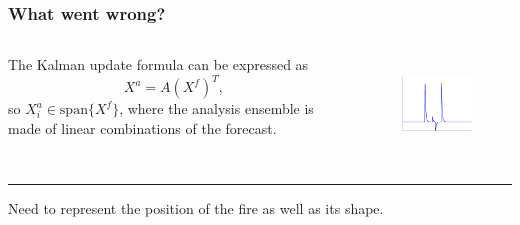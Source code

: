 \documentclass{beamer}
\begin{document}

\begin{frame}
\frametitle{What went wrong?}
\begin{columns}%
%
The Kalman update formula can be expressed as 
\[
X^a=A(X^f)^T,
\]
so $X^a_i\in\mbox{span}\{X^f\}$, where the analysis ensemble is made of \alert{linear combinations} of the forecast.
\vspace{.2in}
%
\begin{figure}[h]
\includegraphics[height=1in]{eps/lincomb}
\end{figure}
\end{columns}
\hrule
\vspace{.2in}
Need to represent the \alert{position} of the fire as well as its \alert{shape}.
\end{frame}
\end{document}
